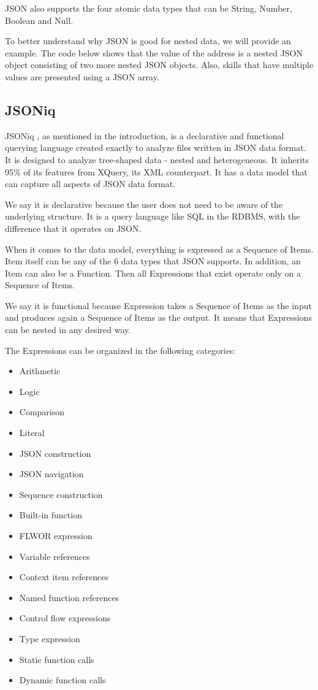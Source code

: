 JSON also supports the four atomic data types that can be String, Number, Boolean and Null.

To better understand why JSON is good for nested data, we will provide an example. The code below shows that the value of the address is a nested JSON object consisting of two more nested JSON objects. Also, skills that have multiple values are presented using a JSON array.



\subsection{JSONiq}
\label{sec:JSONiq}
JSONiq \cite{JSONiqPaper}, as mentioned in the introduction, is a declarative and functional querying language created exactly to analyze files written in JSON data format. It is designed to analyze tree-shaped data - nested and heterogeneous. It inherits 95\% of its features from XQuery, its XML counterpart. It has a data model that can capture all aspects of JSON data format. 

We say it is declarative because the user does not need to be aware of the underlying structure. It is a query language like SQL in the RDBMS, with the difference that it operates on JSON.

When it comes to the data model, everything is expressed as a Sequence of Items. Item itself can be any of the 6 data types that JSON supports. In addition, an Item can also be a Function. Then all Expressions that exist operate only on a Sequence of Items. 

We say it is functional because Expression takes a Sequence of Items as the input and produces again a Sequence of Items as the output. It means that Expressions can be nested in any desired way.

The Expressions can be organized in the following categories:
\begin{multicols}{2}
	\begin{itemize}
		\item Arithmetic
		\item Logic
		\item Comparison
		\item Literal
		\item JSON construction
		\item JSON navigation
		\item Sequence construction
		\item Built-in function
		\item FLWOR expression
		\item Variable references
		\item Context item references
		\item Named function references
		\item Control flow expressions
		\item Type expression
		\item Static function calls
		\item Dynamic function calls
	\end{itemize}
\end{multicols}

